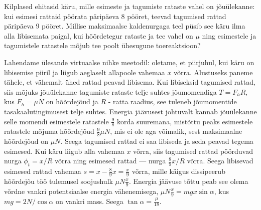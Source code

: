 
Kilplased ehitasid käru, mille esimeste ja tagumiste rataste vahel on jõuülekanne: kui esimesi rattaid pöörata päripäeva 8 pööret, teevad tagumised rattad päripäeva 9 pööret. Millise maksimaalse kaldenurgaga teel püsib see käru ilma alla libisemata paigal, kui hõõrdetegur rataste ja tee vahel on  $\mu$ ning esimestele ja tagumistele ratastele mõjub tee poolt ühesugune  toereaktsioon?






\hint

\solu
Lahendame ülesande virtuaalse nihke meetodil: oletame, et piirjuhul, kui käru on libisemise piiril ja liigub aeglaselt allapoole vahemaa $x$ võrra. Alustuseks paneme tähele, et vähemalt ühed rattad peavad libisema. Kui libiseksid tagumised rattad, siis mõjuks jõuülekanne tagumiste rataste telje suhtes jõumomendiga $T=F_hR$, kus $F_h=\mu N$ on hõõrdejõud ja $R$ - ratta raadius, see tuleneb jõumomentide tasakaalutingimusest telje suhtes. Energia jäävusest johtuvalt kannab jõuülekanne selle momendi esimestele ratastele $\frac 98$ korda suuremana, mistõttu peaks esimestele ratastele mõjuma hõõrdejõud $\frac 98\mu N$, mis ei ole aga võimalik, sest maksimaalne hõõrdejõud on $\mu N$. Seega tagumised rattad ei saa libiseda ja seda peavad tegema esimesed. Kui käru liigub alla vahemaa $x$ võrra, siis  tagumised rattad pöörduvad nurga $\phi_t=x/R$ võrra ning esimesed rattad --- nurga $\frac 89x/R$ võrra. Seega libisevad esimesed rattad vahemaa $s=x-\frac 89x=\frac x9$ võrra, mille käigus dissipeerub hõõrdejõu töö tulemusel soojushulk $\mu N\frac x9$. Energia jäävuse tõttu peab see olema võrdne vankri potentsiaalse energia vähenemisega, $\mu N\frac x9=mgx\sin\alpha$, kus $mg=2N/\cos\alpha$ on vankri mass. Seega $\tan\alpha = \frac \mu{18}$.
\probend